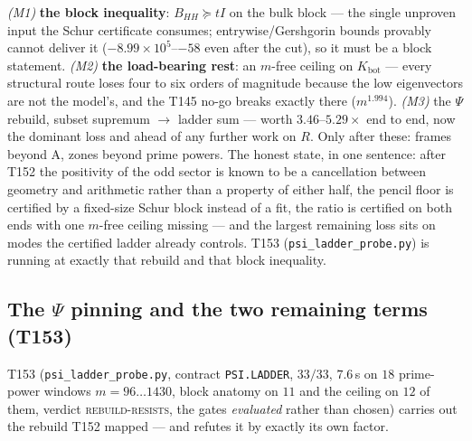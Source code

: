 \documentclass[11pt,a4paper]{article}
\begin{document}
\begin{keybox}
\emph{(M1)} \textbf{the block inequality}: $B_{HH}\succeq tI$ on the bulk block --- the
single unproven input the Schur certificate consumes; entrywise/Gershgorin bounds provably
cannot deliver it ($-8.99\times10^{5}$--$-58$ even after the cut), so it must be a block
statement. \emph{(M2)} \textbf{the load-bearing rest}: an $m$-free ceiling on
$K_{\mathrm{bot}}$ --- every structural route loses four to six orders of magnitude because
the low eigenvectors are not the model's, and the T145 no-go breaks exactly there
($m^{1.994}$). \emph{(M3)} the $\Psi$ rebuild, subset supremum $\to$ ladder sum --- worth
$3.46$--$5.29\times$ end to end, now the dominant loss and ahead of any further work on $R$.
Only after these: frames beyond A, zones beyond prime powers. The honest state, in one
sentence: after T152 the positivity of the odd sector is known to be a cancellation between
geometry and arithmetic rather than a property of either half, the pencil floor is certified
by a fixed-size Schur block instead of a fit, the ratio is certified on both ends with one
$m$-free ceiling missing --- and the largest remaining loss sits on modes the certified
ladder already controls.
T153 (\texttt{psi\_ladder\_probe.py}) is running at exactly that rebuild and that block
inequality.
\end{keybox}

\subsection{The $\Psi$ pinning and the two remaining terms (T153)}
T153 (\texttt{psi\_ladder\_probe.py}, contract \texttt{PSI.LADDER}, $33/33$, $7.6$\,s on
$18$ prime-power windows $m=96\ldots1430$, block anatomy on $11$ and the ceiling on $12$ of
them, verdict \textsc{rebuild-resists}, the gates \emph{evaluated} rather than chosen) carries
out the rebuild T152 mapped --- and refutes it by exactly its own factor.
\end{document}
